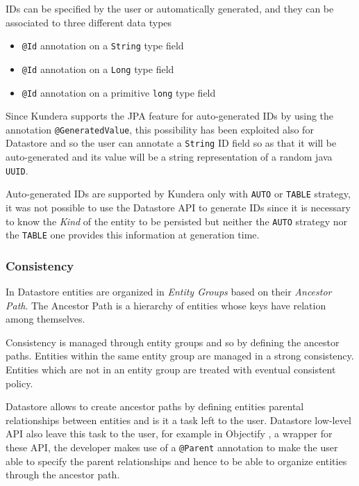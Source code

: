 \newparagraph IDs can be specified by the user or automatically generated, and they can be associated to three different data types
\begin{itemize}
\item \texttt{@Id} annotation on a \texttt{String} type field
\item \texttt{@Id} annotation on a \texttt{Long} type field
\item \texttt{@Id} annotation on a primitive \texttt{long} type field
\end{itemize}

\noindent Since Kundera supports the JPA feature for auto-generated IDs by using the annotation \texttt{@GeneratedValue}, this possibility has been exploited also for Datastore and so the user can annotate a \texttt{String} ID field so as that it will be auto-generated and its value will be a string representation of a random java \texttt{UUID}.

\noindent Auto-generated IDs are supported by Kundera only with \texttt{AUTO} or \texttt{TABLE} strategy, it was not possible to use the Datastore API to generate IDs since it is necessary to know the \textit{Kind} of the entity to be persisted but neither the \texttt{AUTO} strategy nor the \texttt{TABLE} one provides this information at generation time.

\subsubsection{Consistency}
In Datastore entities are organized in \textit{Entity Groups} based on their \textit{Ancestor Path}. The Ancestor Path is a hierarchy of entities whose keys have relation among themselves.

\noindent Consistency is managed through entity groups and so by defining the ancestor paths. Entities within the same entity group are managed in a strong consistency. Entities which are not in an entity group are treated with eventual consistent policy.

\noindent Datastore allows to create ancestor paths by defining entities parental relationships between entities and is it a task left to the user. Datastore low-level API also leave this task to the user, for example in Objectify \cite{online:objectify}, a wrapper for these API, the developer makes use of a \texttt{@Parent} annotation to make the user able to specify the parent relationships and hence to be able to organize entities through the ancestor path.

